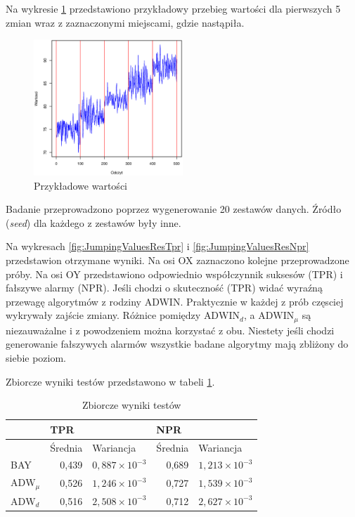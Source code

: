Na wykresie \ref{fig:JumpingValues} przedstawiono przykładowy przebieg wartości dla pierwszych 5 zmian
wraz z zaznaczonymi miejscami,
gdzie nastąpiła.
\begin{figure}[htbp]
  \centering
  \includegraphics[width=0.5\textwidth]{img/ch-5-jumping}
  \caption{Przykładowe wartości}
  \label{fig:JumpingValues}
\end{figure}
Badanie przeprowadzono poprzez wygenerowanie 20 zestawów danych.
Źródło (\textit{seed}) dla każdego z zestawów były inne.

Na wykresach \ref{fig:JumpingValuesResTpr} i \ref{fig:JumpingValuesResNpr} przedstawion otrzymane wyniki.
Na osi OX zaznaczono kolejne przeprowadzone próby.
Na osi OY przedstawiono odpowiednio współczynnik suksesów (TPR) i fałszywe alarmy (NPR).
Jeśli chodzi o skuteczność (TPR) widać wyraźną przewagę algorytmów z rodziny ADWIN.
Praktycznie w każdej z prób częsciej wykrywały zajście zmiany.
Różnice pomiędzy $\mbox{ADWIN}_d$,
a $\mbox{ADWIN}_{\mu}$ są niezauważalne i z powodzeniem można korzystać z obu.
Niestety jeśli chodzi generowanie fałszywych alarmów wszystkie badane algorytmy
mają zbliżony do siebie poziom.

Zbiorcze wyniki testów przedstawono w tabeli \ref{tab:JumpingResult}.
\begin{table}[h]
  \label{tab:JumpingResult}
  \centering
  \begin{tabular}{l r r r r}
    & \multicolumn{2}{l}{TPR} & \multicolumn{2}{l}{NPR} \\
    \hline
    & \multicolumn{1}{l}{Średnia} & \multicolumn{1}{l}{Wariancja}& \multicolumn{1}{l}{Średnia} & \multicolumn{1}{l}{Wariancja} \\
    \hline
    BAY & 0,439 & $0,887 \times 10^{-3}$ & 0,689 & $1,213 \times 10^{-3}$  \\
    $\mbox{ADW}_{\mu}$ & 0,526 & $1,246 \times 10^{-3}$ & 0,727 & $1,539 \times 10^{-3}$ \\
    $\mbox{ADW}_{d}$ & 0,516 & $2,508 \times 10^{-3}$ & 0,712 & $2,627 \times 10^{-3}$ \\
  \end{tabular}
  \caption{Zbiorcze wyniki testów}
\end{table}

